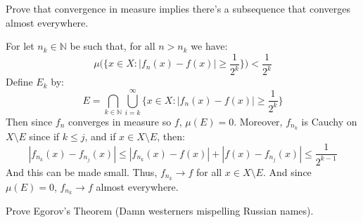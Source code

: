 \documentclass[crop=false,class=article]{standalone}                           %
\begin{document}
        \begin{problem}
            Prove that convergence in measure implies there's a subsequence that
            converges almost everywhere.
        \end{problem}
        \begin{solution}
            For let $n_{k}\in\mathbb{N}$ be such that, for all $n>n_{k}$ we have:
            \begin{equation}
                \mu\Big(\{x\in{X}:|f_{n}(x)-f(x)|\geq\frac{1}{2^{k}}\}\Big)
                    <\frac{1}{2^{k}}
            \end{equation}
            Define $E_{k}$ by:
            \begin{equation}
                E=\bigcap_{k\in\mathbb{N}}\bigcup_{i=k}^{\infty}
                \{x\in{X}:|f_{n}(x)-f(x)|\geq\frac{1}{2^{k}}\}
            \end{equation}
            Then since $f_{n}$ converges in measure so $f$, $\mu(E)=0$. Moreover,
            $f_{n_{k}}$ is Cauchy on $X\setminus{E}$ since if $k\leq{j}$, and if
            $x\in{X}\setminus{E}$, then:
            \begin{equation}
                |f_{n_{k}}(x)-f_{n_{j}}(x)|\leq
                    |f_{n_{k}}(x)-f(x)|+|f(x)-f_{n_{j}}(x)|\leq
                    \frac{1}{2^{k-1}}
            \end{equation}
            And this can be made small. Thus, $f_{n_{k}}\rightarrow{f}$ for all
            $x\in{X\setminus{E}}$. And since $\mu(E)=0$, $f_{n_{k}}\rightarrow{f}$
            almost everywhere.
        \end{solution}
        \begin{problem}
            Prove Egorov's Theorem (Damn westerners mispelling Russian names).
        \end{problem}
\end{document}
